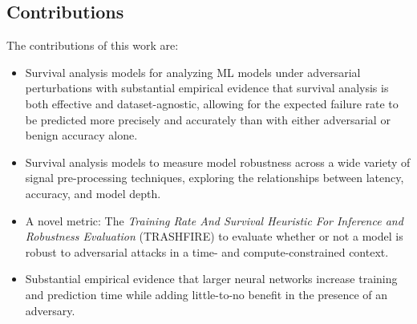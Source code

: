 \subsection{Contributions}

The contributions of this work are:
\begin{itemize}
	\item Survival analysis models for analyzing ML models under adversarial perturbations with substantial empirical evidence that survival analysis is both effective and dataset-agnostic, allowing for the expected failure rate to be predicted more precisely and accurately than with either adversarial or benign accuracy alone.
	\item Survival analysis models to measure model robustness across a wide variety of signal pre-processing techniques, exploring the relationships between latency, accuracy, and model depth.
	\item A novel metric: The \textit{Training Rate And Survival Heuristic For Inference and Robustness Evaluation} (TRASHFIRE) to evaluate whether or not a model is robust to adversarial attacks in a time- and compute-constrained context.
	\item Substantial empirical evidence that larger neural networks increase training and prediction time while adding little-to-no benefit in the presence of an adversary.
\end{itemize}
